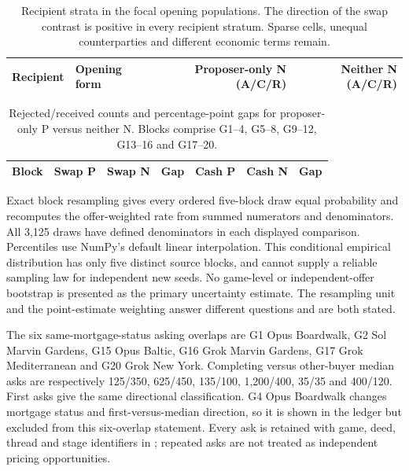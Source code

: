 \begin{table}[ht]\centering\small
\begin{tabular}{@{}llrr@{}}\toprule
Recipient & Opening form & Proposer-only N (A/C/R) & Neither N (A/C/R)\\\midrule

\end{tabular}
\caption{Recipient strata in the focal opening populations. The direction of the swap contrast is positive in every recipient stratum. Sparse cells, unequal counterparties and different economic terms remain.}\label{tab:recipients}
\end{table}
\begin{table}[ht]\centering\small
\begin{tabular}{@{}rrrrrrr@{}}\toprule
Block & Swap P & Swap N & Gap & Cash P & Cash N & Gap\\\midrule

\end{tabular}
\caption{Rejected/received counts and percentage-point gaps for proposer-only P versus neither N. Blocks comprise G1--4, G5--8, G9--12, G13--16 and G17--20.}\label{tab:blocks}
\end{table}
Exact block resampling gives every ordered five-block draw equal probability and recomputes the offer-weighted rate from summed numerators and denominators. All 3,125 draws have defined denominators in each displayed comparison. Percentiles use NumPy's default linear interpolation. This conditional empirical distribution has only five distinct source blocks, and cannot supply a reliable sampling law for independent new seeds. No game-level or independent-offer bootstrap is presented as the primary uncertainty estimate. The resampling unit and the point-estimate weighting answer different questions and are both stated.

The six same-mortgage-status asking overlaps are G1 Opus Boardwalk, G2 Sol Marvin Gardens, G15 Opus Baltic, G16 Grok Marvin Gardens, G17 Grok Mediterranean and G20 Grok New York. Completing versus other-buyer median asks are respectively 125/350, 625/450, 135/100, 1,200/400, 35/35 and 400/120. First asks give the same directional classification. G4 Opus Boardwalk changes mortgage status and first-versus-median direction, so it is shown in the ledger but excluded from this six-overlap statement. Every ask is retained with game, deed, thread and stage identifiers in ; repeated asks are not treated as independent pricing opportunities.

